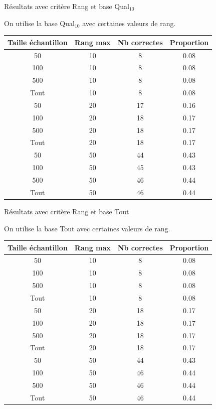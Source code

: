 \documentclass{beamer}
\begin{document}
\begin{frame}{Résultats avec critère Rang et base Qual$_{10}$}

On utilise la base Qual$_{10}$ avec certaines valeurs de rang.
\begin{tabular}{|c|c|c|c|}
   \hline
   Taille échantillon & Rang max & Nb correctes & Proportion\\
   \hline
   50 & 10  & 8 & 0.08  \\
   \hline
   100 & 10  & 8 & 0.08  \\
   \hline
   500 & 10  & 8 & 0.08  \\
   \hline
   Tout & 10  & 8 & 0.08  \\
   \hline
   50 & 20  & 17 & 0.16  \\
   \hline
   100 & 20 & 18 & 0.17  \\
   \hline
   500 & 20 & 18 & 0.17  \\
   \hline
   Tout & 20 & 18 & 0.17 \\
   \hline
   50 & 50 & 44 & 0.43  \\
   \hline
   100 & 50 & 45 & 0.43  \\
   \hline
   500 & 50 & 46 & 0.44  \\
   \hline
   Tout & 50 & 46 & 0.44 \\
   \hline
\end{tabular}
\end{frame}

\begin{frame}{Résultats avec critère Rang et base Tout}

On utilise la base Tout avec certaines valeurs de rang.
\begin{tabular}{|c|c|c|c|}
   \hline
   Taille échantillon & Rang max & Nb correctes & Proportion\\
   \hline
   50 & 10  & 8 & 0.08  \\
   \hline
   100 & 10  & 8 & 0.08  \\
   \hline
   500 & 10  & 8 & 0.08  \\
   \hline
   Tout & 10 & 8 & 0.08 \\
   \hline
   50 & 20  & 18 & 0.17  \\
   \hline
   100 & 20 & 18 & 0.17  \\
   \hline
   500 & 20 & 18 & 0.17  \\
   \hline
   Tout & 20 & 18 & 0.17 \\
   \hline
   50 & 50 & 44 & 0.43  \\
   \hline
   100 & 50 & 46 & 0.44  \\
   \hline
   500 & 50 & 46 & 0.44  \\
   \hline
   Tout & 50 & 46 & 0.44 \\
   \hline
\end{tabular}
\end{frame}
\end{document}
